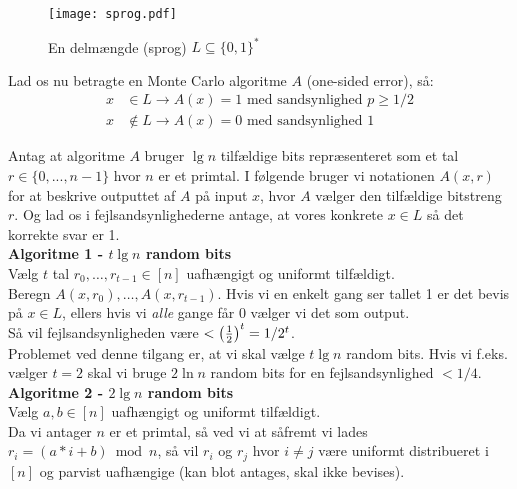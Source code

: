 \begin{figure}[H]
  \begin{center}
  \texttt{[image: sprog.pdf]}
  \end{center}
  \caption{En delmængde (sprog) $L \subseteq \{0, 1\}^\ast$}
  \label{fig:sprog}
\end{figure}

Lad os nu betragte en Monte Carlo algoritme $A$ (one-sided error), så:
\begin{align*}
  x &\in L \rightarrow A(x) = 1 \text{ med sandsynlighed $p \geq 1/2$}\\
  x &\notin L \rightarrow A(x) = 0 \text{ med sandsynlighed $1$}
\end{align*}

Antag at algoritme $A$ bruger $\lg n$ tilfældige bits repræsenteret som et tal $r \in \{0, ..., n-1 \}$ hvor $n$ er et primtal. I følgende bruger vi notationen $A(x, r)$ for at beskrive outputtet af $A$ på input $x$, hvor $A$ vælger den tilfældige bitstreng $r$. Og lad os i fejlsandsynlighederne antage, at vores konkrete $x \in L$ så det korrekte svar er 1.\\

\textbf{Algoritme 1 - $t \lg n$ random bits}\\
Vælg $t$ tal $r_0, \dots, r_{t-1} \in [n]$ uafhængigt og uniformt tilfældigt.\\
Beregn $A(x, r_0), \dots, A(x, r_{t-1})$. Hvis vi en enkelt gang ser tallet 1 er det bevis på $x \in L$, ellers hvis vi \emph{alle} gange får 0 vælger vi det som output.\\

Så vil fejlsandsynligheden være $< \left(  \frac{1}{2}  \right)^t = 1/2^t$.\\

Problemet ved denne tilgang er, at vi skal vælge $t \lg n$ random bits. Hvis vi f.eks. vælger $t = 2$ skal vi bruge $2 \ln n$ random bits for en fejlsandsynlighed $< 1/4$.\\

\textbf{Algoritme 2 - $2 \lg n$ random bits}\\
Vælg $a, b \in [n]$ uafhængigt og uniformt tilfældigt.\\

Da vi antager $n$ er et primtal, så ved vi at såfremt vi lades $r_i = (a * i + b) \bmod n$, så vil $r_i$ og $r_j$ hvor $i \neq j$ være uniformt distribueret i $[n]$ og parvist uafhængige (kan blot antages, skal ikke bevises).\\

